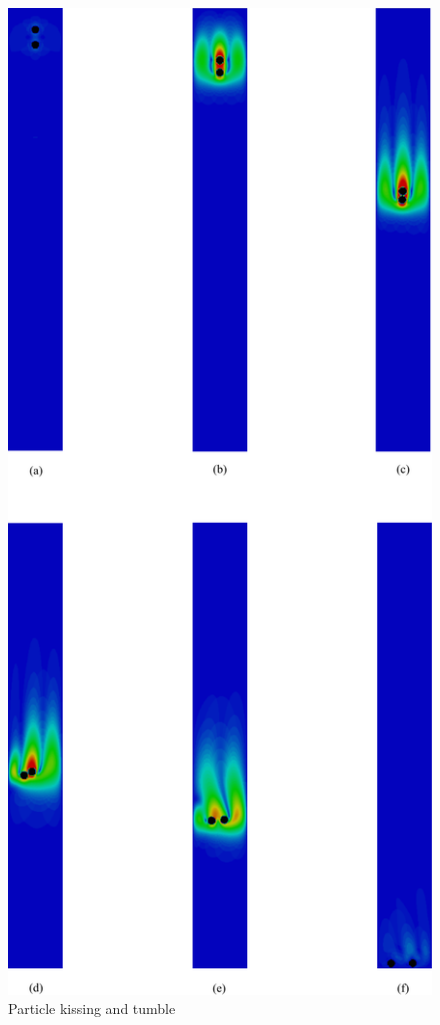 \begin{figure}[htbp]
\centering
\includegraphics[height=0.9\textheight]{kissing}
\caption{Particle kissing and tumble}
\label{fig:kissing}
\end{figure}

